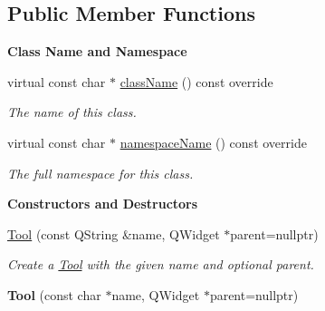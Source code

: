 \subsection*{Public Member Functions}
\begin{Indent}\textbf{ Class Name and Namespace}\par
\begin{DoxyCompactItemize}
\item 
virtual const char $\ast$ \mbox{\hyperlink{classrev_1_1_view_1_1_tool_acde27fd51c9e99e42da65703b496c080}{class\+Name}} () const override
\begin{DoxyCompactList}\small\item\em The name of this class. \end{DoxyCompactList}\item 
virtual const char $\ast$ \mbox{\hyperlink{classrev_1_1_view_1_1_tool_ab5359d977478b9c3e30267bcc4e4a853}{namespace\+Name}} () const override
\begin{DoxyCompactList}\small\item\em The full namespace for this class. \end{DoxyCompactList}\end{DoxyCompactItemize}
\end{Indent}
\begin{Indent}\textbf{ Constructors and Destructors}\par
\begin{DoxyCompactItemize}
\item 
\mbox{\hyperlink{classrev_1_1_view_1_1_tool_a015ac5ba772e5ea5809e3d5926590f60}{Tool}} (const Q\+String \&name, Q\+Widget $\ast$parent=nullptr)
\begin{DoxyCompactList}\small\item\em Create a \mbox{\hyperlink{classrev_1_1_view_1_1_tool}{Tool}} with the given name and optional parent. \end{DoxyCompactList}\item 
\mbox{\label{classrev_1_1_view_1_1_tool_a5754cf6fc15dcdbcfef202728c8baed1}} 
{\bfseries Tool} (const char $\ast$name, Q\+Widget $\ast$parent=nullptr)
\end{DoxyCompactItemize}
\end{Indent}
